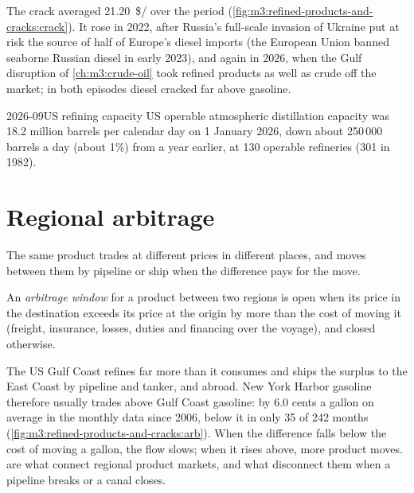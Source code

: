 The crack averaged \qty{21.20}{\$/\barrel} over the period
(\cref{fig:m3:refined-products-and-cracks:crack}). It rose in 2022, after Russia's full-scale invasion of Ukraine put at risk the source
of half of Europe's diesel imports (the European Union banned seaborne Russian diesel
in early 2023), and again in 2026, when the Gulf disruption of \cref{ch:m3:crude-oil} took refined products as well as crude off
the market; in both episodes diesel cracked far above gasoline.

\begin{dated}{2026-09}{US refining capacity}\label{dat:m3:refined-products-and-cracks:capacity}
US operable atmospheric distillation capacity was 18.2 million barrels per calendar day
on 1 January 2026, down about 250\,000 barrels a day (about 1\%) from a year earlier,
at 130 operable refineries (301 in 1982).
\end{dated}

\section{Regional arbitrage}

The same product trades at different prices in different places, and moves
between them by pipeline or ship when the difference pays for the move.

\begin{definition}\label{def:m3:refined-products-and-cracks:arb}
An \emph{arbitrage window} for a product between two regions
is open when its price in the destination exceeds its price at the origin by more
than the cost of moving it (freight, insurance, losses, duties and financing over the
voyage), and closed otherwise.
\end{definition}

The US Gulf Coast refines far more than it consumes and ships the surplus to the
East Coast by pipeline and tanker, and abroad. New York Harbor gasoline therefore
usually trades above Gulf Coast gasoline: by 6.0 cents a gallon on average in the
monthly data since 2006, below it in only 35 of 242 months
(\cref{fig:m3:refined-products-and-cracks:arb}). When the difference falls below the
cost of moving a gallon, the flow slows; when it rises above, more product moves.
 are what connect regional product markets, and what disconnect
them when a pipeline breaks or a canal closes.

